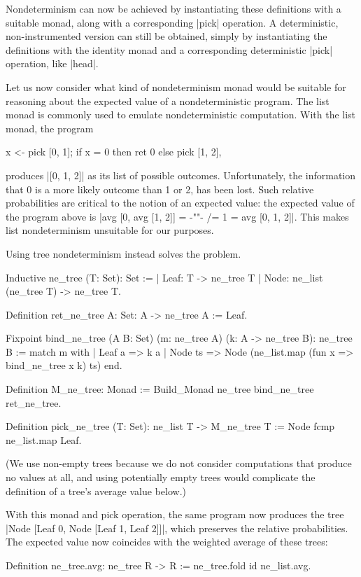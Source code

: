 \documentclass[runningheads]{llncs}
\begin{document}
Nondeterminism can now be achieved by instantiating these definitions with a suitable monad, along with a corresponding |pick| operation. A deterministic, non-instrumented version can still be obtained, simply by instantiating the definitions with the identity monad and a corresponding deterministic |pick| operation, like |head|.

Let us now consider what kind of nondeterminism monad would be suitable for reasoning about the expected value of a nondeterministic program. The list monad is commonly used to emulate nondeterministic computation. With the list monad, the program
\begin{code}
  x <- pick [0, 1]; if x = 0 then ret 0 else pick [1, 2],
\end{code}
produces |[0, 1, 2]| as its list of possible outcomes. Unfortunately, the information that 0 is a more likely outcome than 1 or 2, has been lost. Such relative probabilities are critical to the notion of an expected value: the expected value of the program above is |avg [0, avg [1, 2]] = {-""-} /= 1 = avg [0, 1, 2]|. This makes list nondeterminism unsuitable for our purposes.

Using tree nondeterminism instead solves the problem.
\begin{code}
  Inductive ne_tree (T: Set): Set :=
    | Leaf: T -> ne_tree T
    | Node: ne_list (ne_tree T) -> ne_tree T.

  Definition ret_ne_tree {A: Set}: A -> ne_tree A := Leaf.

  Fixpoint bind_ne_tree (A B: Set) (m: ne_tree A) (k: A -> ne_tree B): ne_tree B :=
    match m with
    | Leaf a => k a
    | Node ts => Node (ne_list.map (fun x => bind_ne_tree x k) ts)
    end.

  Definition M_ne_tree: Monad := Build_Monad ne_tree bind_ne_tree ret_ne_tree.

  Definition pick_ne_tree (T: Set): ne_list T -> M_ne_tree T
    := Node fcmp ne_list.map Leaf.
\end{code}
(We use non-empty trees because we do not consider computations that produce no values at all, and using potentially empty trees would complicate the definition of a tree's average value below.)

With this monad and pick operation, the same program now produces the tree |Node [Leaf 0, Node [Leaf 1, Leaf 2]]|, which preserves the relative probabilities. The expected value now coincides with the weighted average of these trees:
\begin{code}
  Definition ne_tree.avg: ne_tree R -> R := ne_tree.fold id ne_list.avg.
\end{code}
\end{document}
